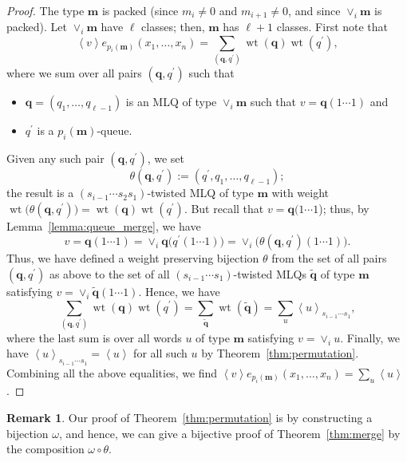 \documentclass[reqno]{amsart}%
\newcommand{\0}{\phantom{c}}
\DeclareMathOperator{\wt}{wt}
\let\sumnonlimits\sum
\renewcommand{\sum}{\sumnonlimits\limits}
\theoremstyle{plain}
\theoremstyle{definition}
\newtheorem{remark}[thm]{Remark}
\numberwithin{equation}{section}
\begin{document}
\begin{proof}
The type $\mathbf{m}$ is packed (since $m_{i} \neq0$ and $m_{i+1} \neq0$, and
since $\vee_{i}\mathbf{m}$ is packed). Let $\vee_{i}\mathbf{m}$ have $\ell$
classes; then, $\mathbf{m}$ has $\ell+1$ classes. First note that
\[
\left\langle v \right\rangle e_{p_{i}(\mathbf{m})}(x_{1}, \dotsc, x_{n}) =
\sum_{(\mathbf{q},q^{\prime})} \wt(\mathbf{q}) \wt(q^{\prime}),
\]
where we sum over all pairs $(\mathbf{q}, q^{\prime})$ such that

\begin{itemize}
\item $\mathbf{q} = (q_{1}, \dotsc, q_{\ell-1})$ is an MLQ of type $\vee
_{i}\mathbf{m}$ such that $v = \mathbf{q}(1\cdots1)$ and

\item $q^{\prime}$ is a $p_{i}(\mathbf{m})$-queue.
\end{itemize}

Given any such pair $\left(  \mathbf{q}, q^{\prime}\right)  $, we set
\[
\theta(\mathbf{q}, q^{\prime}) := (q^{\prime}, q_{1}, \dotsc, q_{\ell-1});
\]
the result is a $(s_{i-1} \dotsm s_{2} s_{1})$-twisted MLQ of type
$\mathbf{m}$ with weight $\wt\bigl( \theta(\mathbf{q}, q^{\prime}) \bigr) =
\wt(\mathbf{q}) \wt(q^{\prime})$. But recall that $v = \mathbf{q}(1 \dotsm1$);
thus, by Lemma~\ref{lemma:queue_merge}, we have
\[
v = \mathbf{q}(1 \dotsm1) = \vee_{i} \mathbf{q}\bigl( q^{\prime}(1 \dotsm1)
\bigr) = \vee_{i} \bigl( \theta(\mathbf{q}, q^{\prime})(1 \dotsm1) \bigr).
\]
Thus, we have defined a weight preserving bijection $\theta$ from the set of
all pairs $(\mathbf{q}, q^{\prime})$ as above to the set of all $(s_{i-1}
\dotsm s_{1})$-twisted MLQs $\widetilde{\mathbf{q}}$ of type $\mathbf{m}$
satisfying $v = \vee_{i} \widetilde{\mathbf{q}} \left(  1 \dotsm1 \right)  $.
Hence, we have
\[
\sum_{(\mathbf{q},q^{\prime})} \wt(\mathbf{q}) \wt(q^{\prime}) =
\sum_{\widetilde{\mathbf{q}}} \wt(\widetilde{\mathbf{q}}) = \sum_{u}
\left\langle u \right\rangle _{s_{i-1} \dotsm s_{1}} ,
\]
where the last sum is over all words $u$ of type $\mathbf{m}$ satisfying $v =
\vee_{i} u$. Finally, we have $\left\langle u \right\rangle _{s_{i-1} \dotsm
s_{1}} = \left\langle u \right\rangle $ for all such $u$ by
Theorem~\ref{thm:permutation}. Combining all the above equalities, we find
$\left\langle v \right\rangle e_{p_{i}(\mathbf{m})}(x_{1}, \dotsc, x_{n}) =
\sum_{u} \left\langle u \right\rangle $.
\end{proof}

\begin{remark}
\label{rmk:bijective_proof} Our proof of Theorem~\ref{thm:permutation} is by
constructing a bijection $\omega$, and hence, we can give a bijective proof of
Theorem~\ref{thm:merge} by the composition $\omega\circ\theta$.
\end{remark}
\end{document}
